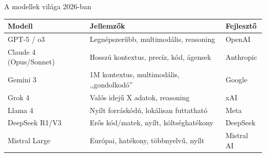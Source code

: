 \documentclass[aspectratio=169, 12pt]{beamer}
\begin{document}
\begin{frame}{A modellek világa 2026-ban}
  \vspace{0.2cm}
  {\small
  \renewcommand{\arraystretch}{1.15}
  \begin{tabularx}{\textwidth}{l X l}
    \textbf{Modell} & \textbf{Jellemzők} & \textbf{Fejlesztő} \\
    \midrule
    GPT-5 / o3 & Legnépszerűbb, multimodális, reasoning & OpenAI \\
    Claude 4 (Opus/Sonnet) & Hosszú kontextus, precíz, kód, ágensek & Anthropic \\
    Gemini 3 & 1M kontextus, multimodális, ,,gondolkodó'' & Google \\
    Grok 4 & Valós idejű X adatok, reasoning & xAI \\
    Llama 4 & Nyílt forráskódú, lokálisan futtatható & Meta \\
    DeepSeek R1/V3 & Erős kód/matek, nyílt, költséghatékony & DeepSeek \\
    Mistral Large & Európai, hatékony, többnyelvű, nyílt & Mistral AI \\
  \end{tabularx}
  }
\end{frame}
\end{document}
